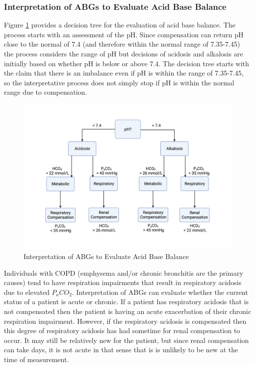 \subsubsection{Interpretation of ABGs to Evaluate Acid Base Balance}

Figure \ref{fig:ABGs} provides a decision tree for the evaluation of acid base balance. The process starts with an assessment of the pH. Since compensation can return pH close to the normal of 7.4 (and therefore within the normal range of 7.35-7.45) the process considers the range of pH but decisions of acidosis and alkalosis are initially based on whether pH is below or above 7.4. The decision tree starts with the claim that there is an imbalance even if pH is within the range of 7.35-7.45, so the interpretative process does not simply stop if pH is within the normal range due to compensation.


\begin{figure}[!h]
    \centering
    \includegraphics[width=1.0\linewidth]{./figure/ABGs.png}
    \caption{Interpretation of ABGs to Evaluate Acid Base Balance}
    \label{fig:ABGs}
\end{figure}

Individuals with COPD (emphysema and/or chronic bronchitis are the primary causes) tend to have respiration impairments that result in respiratory acidosis due to elevated $P_aCO_2$. Interpretation of ABGs can evaluate whether the current status of a patient is acute or chronic. If a patient has respiratory acidosis that is not compensated then the patient is having an acute exacerbation of their chronic respiration impairment. However, if the respiratory acidosis is compensated then this degree of respiratory acidosis has had sometime for renal compensation to occur. It may still be relatively new for the patient, but since renal compensation can take days, it is not acute in that sense that is is unlikely to be new at the time of measurement.\footnotemark{}


